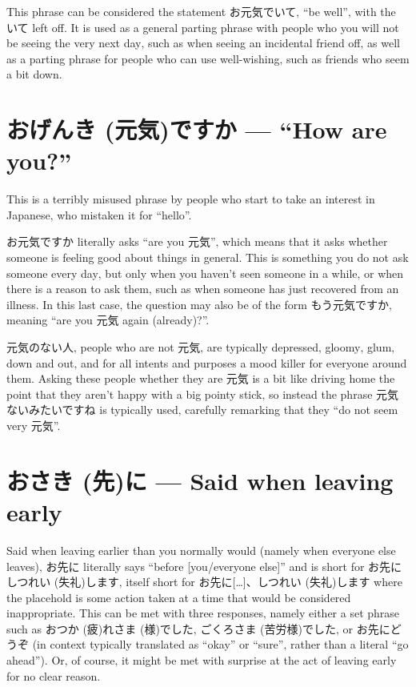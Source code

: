 \documentclass[11pt, b5paper, twoside, openright, onecolumn]{book}
\makeatletter
\newcommand*{\rubystack}[2]{{\relscale{0.5}%
  \begin{tabular}[b]{@{}c@{}}%
    {#1}\\%
   {\textscale{2}{#2}}%
  \end{tabular}}%
}
\DeclareRobustCommand*{\ruby}[2]{%
  \mbox{%
    \setlength{\parskip}{0ex}%
    \BeginAccSupp{method=pdfstringdef,ActualText={#1}}%
      \rubystack{\phantom{#2}}{#1}%
      \llap{%
        \rubystack{#2}{\phantom{#1}}%
      }%
    \EndAccSupp{}%
  }%
}
\renewcommand*{\ruby}[2]{#2 (#1)}%
\makeatother
\begin{document}
This phrase can be considered the statement お元気でいて‚ “be well”‚ with the いて left off. It is used as a general parting phrase with people who you will not be seeing the very next day‚ such as when seeing an incidental friend off‚ as well as a parting phrase for people who can use well-wishing‚ such as friends who seem a bit down.

\section*{お\ruby{元気}{げんき}ですか — “How are you?”}

This is a terribly misused phrase by people who start to take an interest in Japanese‚ who mistaken it for “hello”.

お元気ですか literally asks “are you 元気”‚ which means that it asks whether someone is feeling good about things in general. This is something you do not ask someone every day‚ but only when you haven’t seen someone in a while‚ or when there is a reason to ask them‚ such as when someone has just recovered from an illness. In this last case‚ the question may also be of the form もう元気ですか‚ meaning “are you 元気 again (already)?”.

元気のない人‚ people who are not 元気‚ are typically depressed‚ gloomy‚ glum‚ down and out‚ and for all intents and purposes a mood killer for everyone around them. Asking these people whether they are 元気 is a bit like driving home the point that they aren’t happy with a big pointy stick‚ so instead the phrase 元気ないみたいですね is typically used‚ carefully remarking that they “do not seem very 元気”.

\section*{お\ruby{先}{さき}に — Said when leaving early}

Said when leaving earlier than you normally would (namely when everyone else leaves)‚ お先に literally says “before [you/everyone else]” and is short for お先に\ruby{失礼}{しつれい}します‚ itself short for お先に[…]、\ruby{失礼}{しつれい}します where the placehold is some action taken at a time that would be considered inappropriate. This can be met with three responses‚ namely either a set phrase such as お\ruby{疲}{つか}れ\ruby{様}{さま}でした‚ ご\ruby{苦労様}{くろさま}でした‚ or お先にどうぞ (in context typically translated as “okay” or “sure”‚ rather than a literal “go ahead”). Or‚ of course‚ it might be met with surprise at the act of leaving early for no clear reason.
\end{document}
